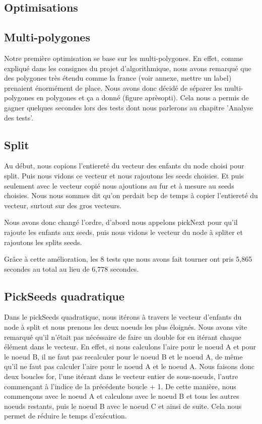 \documentclass[utf8]{article}
\begin{document}
\begin{large}
  \section{Optimisations}
  \subsection{Multi-polygones}
  \par
  \indent
  Notre première optimisation se base sur les multi-polygones. En effet, comme
  expliqué dans les consignes du projet d'algorithmique, nous avons remarqué que
  des polygones très étendu comme la france (voir annexe, mettre un label)
  prenaient énormément de place. Nous avons donc décidé de séparer les
  multi-polygones en polygones et ça a donné (figure aprèsopti). Cela nous a
  permis de gagner quelques secondes lors des tests dont nous parlerons au
  chapitre 'Analyse des tests'.

  \subsection{Split}
  \par
  \indent
  Au début, nous copions l'entiereté du vecteur des enfants du node choisi pour
  split. Puis nous vidons ce vecteur et nous rajoutons les seeds choisies. Et puis
  seulement avec le vecteur copié nous ajoutions au fur et à mesure au seeds
  choisies. Nous nous sommes dit qu'on perdait bcp de temps à copier l'entiereté
  du vecteur, surtout sur des gros vecteurs.

  Nous avons donc changé l'ordre, d'abord nous appelons pickNext pour qu'il
  rajoute les enfants aux seeds, puis nous vidons le vecteur du node à spliter et
  rajoutons les splits seeds.

  Grâce à cette amélioration, les 8 tests que nous avons fait tourner ont pris
  5,865 secondes au total au lieu de 6,778 secondes.
  \par
  \subsection{PickSeeds quadratique}
  \par
  \indent
  Dans le pickSeeds quadratique, nous itérons à travers le vecteur d'enfants du node à
  split et nous prenons les deux noeuds les plus éloignés. Nous avons vite
  remarqué qu'il n'était pas nécéssaire de faire un double for en itérant chaque
  élément dans le vecteur. En effet, si nous calculons l'aire pour le noeud A
  et pour le noeud B, il ne faut pas recalculer pour le noeud B et le noeud A, de
  même qu'il ne faut pas calculer l'aire pour le noeud A et le noeud A. Nous
  faisons donc deux boucles for, l'une itérant dans le vecteur entier de
  sous-noeuds, l'autre commençant à l'indice de la précédente boucle + 1. De cette
  manière, nous commençons avec le noeud A et calculons avec le noeud B et tous
  les autres noeuds restants, puis le noeud B avec le noeud C et ainsi de suite. Cela nous permet de réduire le temps d'exécution.


\end{large}
\end{document}
